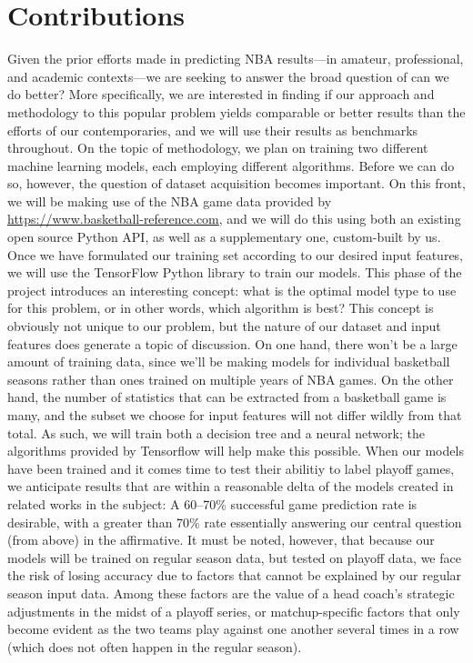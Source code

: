 \documentclass[letterpaper]{article} %
\begin{document}
\section{Contributions}

Given the prior efforts made in predicting NBA results---in amateur, professional, and academic contexts---we are seeking to answer the broad question of can we do better? More specifically, we are interested in finding if our approach and methodology to this popular problem yields comparable or better results than the efforts of our contemporaries, and we will use their results as benchmarks throughout. On the topic of methodology, we plan on training two different machine learning models, each employing different algorithms. Before we can do so, however, the question of dataset acquisition becomes important. On this front, we will be making use of the NBA game data provided by \href{https://www.basketball-reference.com}{https://www.basketball-reference.com}, and we will do this using both an existing open source Python API, as well as a supplementary one, custom-built by us. Once we have formulated our training set according to our desired input features, we will use the TensorFlow Python library to train our models. This phase of the project introduces an interesting concept: what is the optimal model type to use for this problem, or in other words, which algorithm is best? This concept is obviously not unique to our problem, but the nature of our dataset and input features does generate a topic of discussion. On one hand, there won’t be a large amount of training data, since we’ll be making models for individual basketball seasons rather than ones trained on multiple years of NBA games. On the other hand, the number of statistics that can be extracted from a basketball game is many, and the subset we choose for input features will not differ wildly from that total. As such, we will train both a decision tree and a neural network; the algorithms provided by Tensorflow will help make this possible. When our models have been trained and it comes time to test their abilitiy to label playoff games, we anticipate results that are within a reasonable delta of the models created in related works in the subject: A 60–70\% successful game prediction rate is desirable, with a greater than 70\% rate essentially answering our central question (from above) in the affirmative. It must be noted, however, that because our models will be trained on regular season data, but tested on playoff data, we face the risk of losing accuracy due to factors that cannot be explained by our regular season input data. Among these factors are the value of a head coach’s strategic adjustments in the midst of a playoff series, or matchup-specific factors that only become evident as the two teams play against one another several times in a row (which does not often happen in the regular season).
\end{document}
